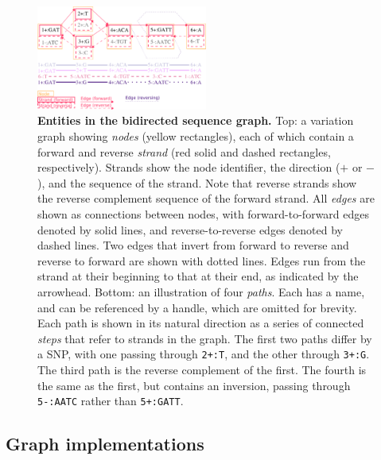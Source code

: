 \documentclass[11pt]{ucthesis}
\begin{document}
\begin{figure}
	\begin{center}
		\includegraphics[width=0.5\textwidth]{handlefigures/GRaphchrXpaper.png}
	\end{center}
	\caption{{\label{fig:graph}
        \textbf{Entities in the bidirected sequence graph.}
        Top: a variation graph showing \emph{nodes} (yellow rectangles), each of which contain a forward and reverse \emph{strand} (red solid and dashed rectangles, respectively).
        Strands show the node identifier, the direction ($+$ or $-$), and the sequence of the strand.
        Note that reverse strands show the reverse complement sequence of the forward strand.
        All \emph{edges} are shown as connections between nodes, with forward-to-forward edges denoted by solid lines, and reverse-to-reverse edges denoted by dashed lines.
        Two edges that invert from forward to reverse and reverse to forward are shown with dotted lines.
        Edges run from the strand at their beginning to that at their end, as indicated by the arrowhead.
        Bottom: an illustration of four \emph{paths}.
        Each has a name, and can be referenced by a handle, which are omitted for brevity.
        Each path is shown in its natural direction as a series of connected \emph{steps} that refer to strands in the graph.
        The first two paths differ by a SNP, with one passing through \texttt{2+:T}, and the other through \texttt{3+:G}.
        The third path is the reverse complement of the first.
        The fourth is the same as the first, but contains an inversion, passing through \texttt{5-:AATC} rather than \texttt{5+:GATT}.
      }
    }
\end{figure}

\subsection{Graph implementations}
\end{document}
